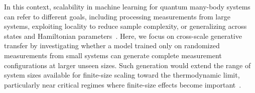 \documentclass[pdflatex,sn-nature]{sn-jnl}%
\theoremstyle{thmstyleone}%
\theoremstyle{thmstyletwo}%
\theoremstyle{thmstylethree}%
\begin{document}
In this context, scalability in machine learning for quantum many-body systems can refer to different goals, including processing measurements from large systems, exploiting locality to reduce sample complexity, or generalizing across states and Hamiltonian parameters~\cite{cho2024machine,chinzei2025learning,wang2022predicting}. Here, we focus on cross-scale generative transfer by investigating whether a model trained only on randomized measurements from small systems can generate complete measurement configurations at larger unseen sizes. Such generation would extend the range of system sizes available for finite-size scaling toward the thermodynamic limit, particularly near critical regimes where finite-size effects become important~\cite{fisher1972scaling}.
\end{document}
